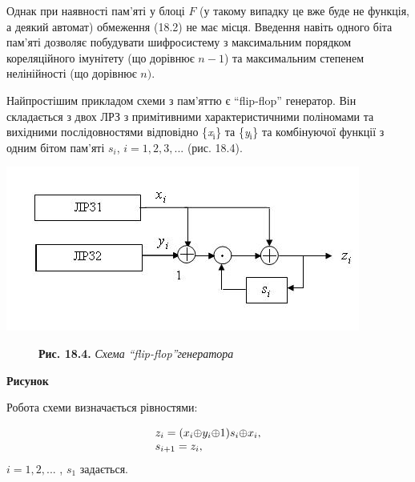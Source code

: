 \documentclass[a4paper]{article}
\newcommand\textsubscript[1]{\ensuremath{{}_{\text{#1}}}}
\newcounter{}
\renewcommand\the{\arabic{}}
\begin{document}
\bigskip

 Однак при наявності пам’яті у блоці  ${F}$ (у такому випадку це вже буде не
функція, а деякий автомат) обмеження (18.2) не має місця. Введення навіть
одного біта пам’яті дозволяє побудувати шифросистему з максимальним порядком
кореляційного імунітету (що дорівнює  ${n-1}$) та максимальним степенем
нелінійності (що дорівнює  ${n)\text{.}}$

Найпростішим прикладом схеми з пам’яттю є “flip{}-flop” генератор. Він
складається з двох ЛРЗ з примітивними характеристичними поліномами та вихідними
послідовностями відповідно \{\textit{x}\textit{\textsubscript{і}}\} та
\{\textit{y}\textit{\textsubscript{і}}\} та комбінуючої функції з одним бітом
пам’яті  ${s_{{i}}}$,  ${i=1,2,3,\text{.}\text{.}\text{.}}$ (рис. 18.4). 

{\centering 
\includegraphics[width=4.5835in,height=2.1354in]{crypt-img/crypt-img340.jpg}
\par}

\begin{figure}
\centering
\begin{minipage}{3.1874in}
\textbf{Рис. 18.4. }\textit{Схема }\textit{“flip-flop”}\textit{генератора}
\end{minipage}
\end{figure}
{\centering\bfseries
Рисунок \stepcounter{}{\the}
\par}


\bigskip

Робота схеми визначається рівностями:

\begin{equation*}
\begin{matrix}{z_{{i}}=(x_{{i}}{\oplus}y_{{i}}{\oplus}1)s_{{i}}{\oplus}x_{{i}},}\hfill\null
\\s_{{i+1}}=z_{{i}},\hfill\null \end{matrix}\hfill 
\end{equation*}
 ${i=1,2,\text{.}\text{.}\text{.}}$ ,   ${s_{{1}}}$ задається.
\end{document}
